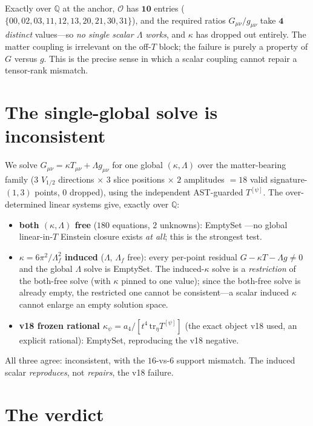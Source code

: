 \documentclass[11pt]{article}
\newcommand{\QQ}{\mathbb{Q}}
\begin{document}
Exactly over $\QQ$ at the anchor, $\mathcal{O}$ has $\mathbf{10}$ entries
($\{00,02,03,11,12,13,20,21,30,31\}$), and the required ratios $G_{\mu\nu}/g_{\mu\nu}$ take
$\mathbf{4}$ \emph{distinct} values---so \emph{no single scalar $\Lambda$ works}, and $\kappa$
has dropped out entirely. The matter coupling is irrelevant on the off-$T$ block; the failure is
purely a property of $G$ versus $g$. This is the precise sense in which a scalar coupling cannot
repair a tensor-rank mismatch.

\section{The single-global solve is inconsistent}\label{sec:solve}

We solve $G_{\mu\nu}=\kappa T_{\mu\nu}+\Lambda g_{\mu\nu}$ for one global $(\kappa,\Lambda)$
over the matter-bearing family ($3$ $V_{1/2}$ directions $\times$ $3$ slice positions $\times$
$2$ amplitudes $=18$ valid signature-$(1,3)$ points, $0$ dropped), using the independent
AST-guarded $T^{[\psi]}$. The over-determined linear systems give, exactly over $\QQ$:
\begin{itemize}
\item \textbf{both $(\kappa,\Lambda)$ free} ($180$ equations, $2$ unknowns): \textsf{EmptySet}
---no global linear-in-$T$ Einstein closure exists \emph{at all}; this is the strongest test.
\item \textbf{$\kappa=6\pi^2/\Lambda_f^2$ induced} ($\Lambda$, $\Lambda_f$ free): every
per-point residual $G-\kappa T-\Lambda g\neq0$ and the global $\Lambda$ solve is
\textsf{EmptySet}. The induced-$\kappa$ solve is a \emph{restriction} of the both-free solve
(with $\kappa$ pinned to one value); since the both-free solve is already empty, the restricted
one cannot be consistent---a scalar induced $\kappa$ cannot enlarge an empty solution space.
\item \textbf{v18 frozen rational $\kappa_\psi=a_4/[t^4\,\mathrm{tr}_\eta T^{[\psi]}]$} (the
exact object v18 used, an explicit rational): \textsf{EmptySet}, reproducing the v18 negative.
\end{itemize}
All three agree: inconsistent, with the $16$-vs-$6$ support mismatch. The induced scalar
\emph{reproduces}, not \emph{repairs}, the v18 failure.

\section{The verdict}\label{sec:verdict}
\end{document}
